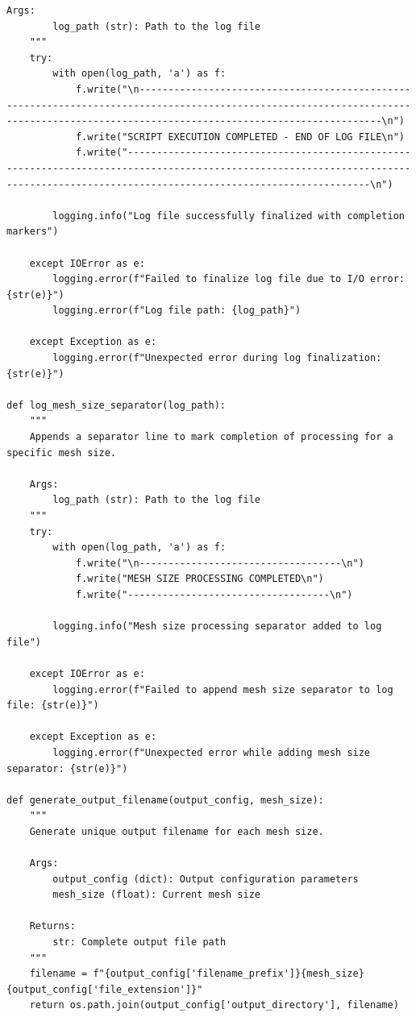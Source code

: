 \documentclass{book}
\begin{document}
\begin{itemize}[leftmargin=*,label=\textbullet]
\begin{itemize}
\begin{lstlisting}[caption={Phase 1 Meshing Automation Script},label={lst:phase1}]
    Args:
        log_path (str): Path to the log file
    """
    try:
        with open(log_path, 'a') as f:
            f.write("\n--------------------------------------------------------------------------------------------------------------------------------------------------------------------------------------\n")
            f.write("SCRIPT EXECUTION COMPLETED - END OF LOG FILE\n")
            f.write("--------------------------------------------------------------------------------------------------------------------------------------------------------------------------------------\n")
        
        logging.info("Log file successfully finalized with completion markers")
        
    except IOError as e:
        logging.error(f"Failed to finalize log file due to I/O error: {str(e)}")
        logging.error(f"Log file path: {log_path}")
        
    except Exception as e:
        logging.error(f"Unexpected error during log finalization: {str(e)}")

def log_mesh_size_separator(log_path):
    """
    Appends a separator line to mark completion of processing for a specific mesh size.
    
    Args:
        log_path (str): Path to the log file
    """
    try:
        with open(log_path, 'a') as f:
            f.write("\n-----------------------------------\n")
            f.write("MESH SIZE PROCESSING COMPLETED\n")
            f.write("-----------------------------------\n")
        
        logging.info("Mesh size processing separator added to log file")
        
    except IOError as e:
        logging.error(f"Failed to append mesh size separator to log file: {str(e)}")
        
    except Exception as e:
        logging.error(f"Unexpected error while adding mesh size separator: {str(e)}")

def generate_output_filename(output_config, mesh_size):
    """
    Generate unique output filename for each mesh size.
    
    Args:
        output_config (dict): Output configuration parameters
        mesh_size (float): Current mesh size
        
    Returns:
        str: Complete output file path
    """
    filename = f"{output_config['filename_prefix']}{mesh_size}{output_config['file_extension']}"
    return os.path.join(output_config['output_directory'], filename)


\end{lstlisting}
\end{itemize}
\end{itemize}
\end{document}
